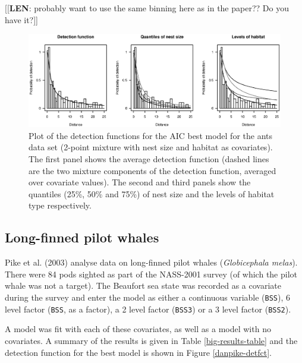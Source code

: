 \documentclass[useAMS,referee, usegraphicx]{biom}
\begin{document}
[[\textbf{LEN}: probably want to use the same binning here as in the paper?? Do you have it?]]

\begin{figure}
\centering
\includegraphics[width=\textwidth]{analyses/ants-nesthab.eps}
\caption{Plot of the detection functions for the AIC best model for the ants data set (2-point mixture with nest size and habitat as covariates). The first panel shows the average detection function (dashed lines are the two mixture components of the detection function, averaged over covariate values). The second and third panels show the quantiles (25\%, 50\% and 75\%) of nest size and the levels of habitat type respectively.}
\label{ants-nesthab}
\end{figure}


\subsection{Long-finned pilot whales}

Pike et al. (2003) analyse data on long-finned pilot whales (\textit{Globicephala melas}). There were 84 pods sighted as part of the NASS-2001 survey (of which the pilot whale was not a target). The Beaufort sea state was recorded as a covariate during the survey and enter the model as either a continuous variable (\texttt{BSS}), 6 level factor (\texttt{BSS}, as a factor), a 2 level factor (\texttt{BSS3}) or a 3 level factor (\texttt{BSS2}).

A model was fit with each of these covariates, as well as a model with no covariates. A summary of the results is given in Table \ref{big-results-table} and the detection function for the best model is shown in Figure \ref{danpike-detfct}.

\end{document}
